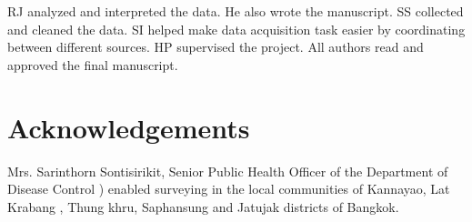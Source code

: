 \documentclass{bmcart}
\begin{document}
\begin{backmatter}
RJ analyzed and interpreted the data. He also wrote the manuscript. SS collected and cleaned the data. SI helped make data acquisition task easier by coordinating between different sources. HP supervised the project. All authors read and approved the final manuscript. 
    
      
\section*{Acknowledgements}
Mrs. Sarinthorn Sontisirikit, Senior Public Health Officer of the Department of Disease Control ) enabled surveying in the local communities of Kannayao, Lat Krabang , Thung khru, Saphansung and Jatujak districts of Bangkok.
  

\clearpage







\end{backmatter}
\end{document}
